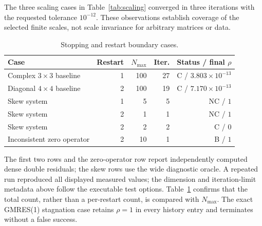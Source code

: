 The three scaling cases in Table~\ref{tab:scaling} converged in three iterations
with the requested tolerance $10^{-12}$. These observations establish coverage of
the selected finite scales, not scale invariance for arbitrary matrices or data.

\begin{table}[H]
\centering
\small
\caption{Stopping and restart boundary cases.}
\label{tab:stopping}
\begin{tabular}{lrrrr}
\toprule
Case & Restart & $N_{\max}$ & Iter. & Status / final $\rho$ \\
\midrule
Complex $3\times3$ baseline & 1 & 100 & 27 & C / $3.803\times10^{-13}$ \\
Diagonal $4\times4$ baseline & 2 & 100 & 19 & C / $7.170\times10^{-13}$ \\
Skew system & 1 & 5 & 5 & NC / $1$ \\
Skew system & 2 & 1 & 1 & NC / $1$ \\
Skew system & 2 & 2 & 2 & C / $0$ \\
Inconsistent zero operator & 2 & 10 & 1 & B / $1$ \\
\bottomrule
\end{tabular}
\end{table}

The first two rows and the zero-operator row report independently computed dense
double residuals; the skew rows use the wide diagnostic oracle. A repeated run
reproduced all displayed measured values; the dimension and iteration-limit
metadata above follow the executable test options.
Table~\ref{tab:stopping} confirms that the total count, rather than a per-restart
count, is compared with $N_{\max}$. The exact GMRES(1) stagnation case retains
$\rho=1$ in every history entry and terminates without a false success.

